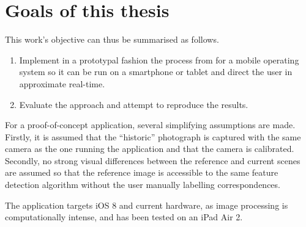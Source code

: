 \section{Goals of this thesis}

This work's objective can thus be summarised as follows.
\begin{enumerate}
   \item Implement in a prototypal fashion the process from \citep{bae2010} for
      a mobile operating system so it can be run on a smartphone or tablet and
      direct the user in approximate real-time.
   \item Evaluate the approach and attempt to reproduce the results.
\end{enumerate}

For a proof-of-concept application, several simplifying assumptions are made.
Firstly, it is assumed that the ``historic'' photograph is captured with the
same camera as the one running the application and that the camera is calibrated.
Secondly, no strong visual differences between the reference and current scenes
are assumed so that the reference image is accessible to the same feature
detection algorithm without the user manually labelling correspondences. 

The application targets iOS 8 and current hardware, as image processing is
computationally intense, and has been tested on an iPad Air 2.

